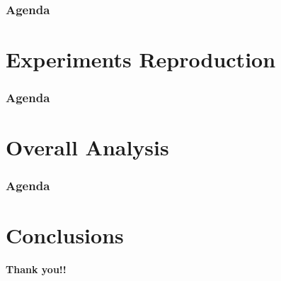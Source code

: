 \documentclass{beamer}
\begin{document}
\begin{frame}
  \frametitle{Agenda}
  \section{Experiments Reproduction}
  \tableofcontents[currentsection]
\end{frame}

\begin{frame}
  \frametitle{Agenda}
  \section{Overall Analysis}
  \tableofcontents[currentsection]
\end{frame}

\begin{frame}
  \frametitle{Agenda}
  \section{Conclusions}
  \tableofcontents[currentsection]
\end{frame}


\begin{frame}
  \begin{center}
    \textbf{\huge{Thank you!!}}
    \end{center}
\end{frame}
\end{document}
